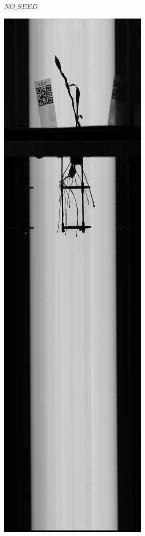 \begin{figure}
\begin{subfigure}[t]{.13\textwidth}
  \caption{$NO\_SEED$}
  \label{fig:NO_SEED}
\end{subfigure}
%
\begin{subfigure}[t]{.13\textwidth}
  \centering
  \includegraphics[width=\linewidth]{figures/NOT_FG.jpg}

\end{subfigure}
\end{figure}
